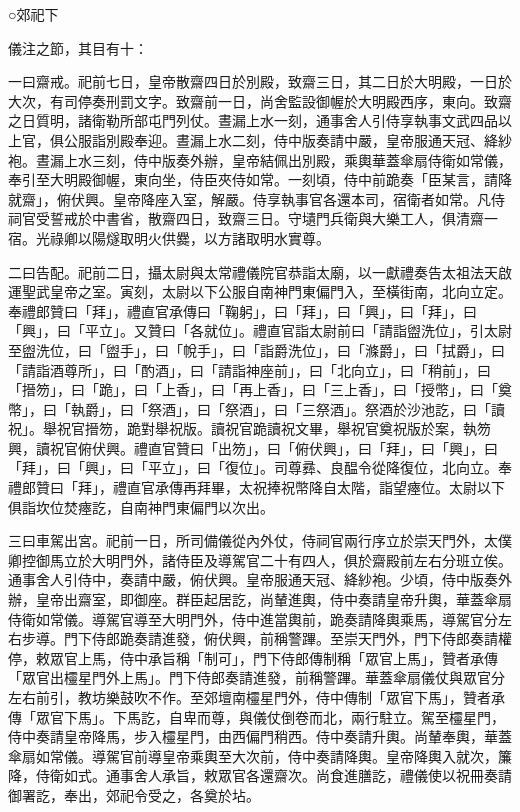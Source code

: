 
\begin{pinyinscope}

 ○郊祀下



 儀注之節，其目有十：



 一曰齋戒。祀前七日，皇帝散齋四日於別殿，致齋三日，其二日於大明殿，一日於大次，有司停奏刑罰文字。致齋前一日，尚舍監設御幄於大明殿西序，東向。致齋之日質明，諸衛勒所部屯門列仗。晝漏上水一刻，通事舍人引侍享執事文武四品以上官，俱公服詣別殿奉迎。晝漏上水二刻，侍中版奏請中嚴，皇帝服通天冠、絳紗袍。晝漏上水三刻，侍中版奏外辦，皇帝結佩出別殿，乘輿華蓋傘扇侍衛如常儀，奉引至大明殿御幄，東向坐，侍臣夾侍如常。一刻頃，侍中前跪奏「臣某言，請降就齋」，俯伏興。皇帝降座入室，解嚴。侍享執事官各還本司，宿衛者如常。凡侍祠官受誓戒於中書省，散齋四日，致齋三日。守壝門兵衛與大樂工人，俱清齋一宿。光祿卿以陽燧取明火供爨，以方諸取明水實尊。



 二曰告配。祀前二日，攝太尉與太常禮儀院官恭詣太廟，以一獻禮奏告太祖法天啟運聖武皇帝之室。寅刻，太尉以下公服自南神門東偏門入，至橫街南，北向立定。奉禮郎贊曰「拜」，禮直官承傳曰「鞠躬」，曰「拜」，曰「興」，曰「拜」，曰「興」，曰「平立」。又贊曰「各就位」。禮直官詣太尉前曰「請詣盥洗位」，引太尉至盥洗位，曰「盥手」，曰「帨手」，曰「詣爵洗位」，曰「滌爵」，曰「拭爵」，曰「請詣酒尊所」，曰「酌酒」，曰「請詣神座前」，曰「北向立」，曰「稍前」，曰「搢笏」，曰「跪」，曰「上香」，曰「再上香」，曰「三上香」，曰「授幣」，曰「奠幣」，曰「執爵」，曰「祭酒」，曰「祭酒」，曰「三祭酒」。祭酒於沙池訖，曰「讀祝」。舉祝官搢笏，跪對舉祝版。讀祝官跪讀祝文畢，舉祝官奠祝版於案，執笏興，讀祝官俯伏興。禮直官贊曰「出笏」，曰「俯伏興」，曰「拜」，曰「興」，曰「拜」，曰「興」，曰「平立」，曰「復位」。司尊彞、良醖令從降復位，北向立。奉禮郎贊曰「拜」，禮直官承傳再拜畢，太祝捧祝幣降自太階，詣望瘞位。太尉以下俱詣坎位焚瘞訖，自南神門東偏門以次出。



 三曰車駕出宮。祀前一日，所司備儀從內外仗，侍祠官兩行序立於崇天門外，太僕卿控御馬立於大明門外，諸侍臣及導駕官二十有四人，俱於齋殿前左右分班立俟。通事舍人引侍中，奏請中嚴，俯伏興。皇帝服通天冠、絳紗袍。少頃，侍中版奏外辦，皇帝出齋室，即御座。群臣起居訖，尚輦進輿，侍中奏請皇帝升輿，華蓋傘扇侍衛如常儀。導駕官導至大明門外，侍中進當輿前，跪奏請降輿乘馬，導駕官分左右步導。門下侍郎跪奏請進發，俯伏興，前稱警蹕。至崇天門外，門下侍郎奏請權停，敕眾官上馬，侍中承旨稱「制可」，門下侍郎傳制稱「眾官上馬」，贊者承傳「眾官出欞星門外上馬」。門下侍郎奏請進發，前稱警蹕。華蓋傘扇儀仗與眾官分左右前引，教坊樂鼓吹不作。至郊壇南欞星門外，侍中傳制「眾官下馬」，贊者承傳「眾官下馬」。下馬訖，自卑而尊，與儀仗倒卷而北，兩行駐立。駕至欞星門，侍中奏請皇帝降馬，步入欞星門，由西偏門稍西。侍中奏請升輿。尚輦奉輿，華蓋傘扇如常儀。導駕官前導皇帝乘輿至大次前，侍中奏請降輿。皇帝降輿入就次，簾降，侍衛如式。通事舍人承旨，敕眾官各還齋次。尚食進膳訖，禮儀使以祝冊奏請御署訖，奉出，郊祀令受之，各奠於坫。




\end{pinyinscope}
